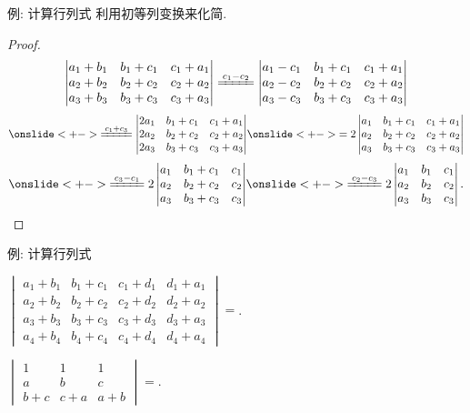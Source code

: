 \begin{frame}{例: 计算行列式}
	\onslide<+->
	利用初等列变换来化简.
	\onslide<+->
	\begin{proof}
		\[\begin{vmatrix}
			a_1+b_1&b_1+c_1&c_1+a_1\\
			a_2+b_2&b_2+c_2&c_2+a_2\\
			a_3+b_3&b_3+c_3&c_3+a_3
		\end{vmatrix}\xeq{c_1-c_2}\begin{vmatrix}
			a_1-c_1&b_1+c_1&c_1+a_1\\
			a_2-c_2&b_2+c_2&c_2+a_2\\
			a_3-c_3&b_3+c_3&c_3+a_3
		\end{vmatrix}\]\[
		\onslide<+->{\xeq{c_1+c_3}\begin{vmatrix}
			2a_1&b_1+c_1&c_1+a_1\\
			2a_2&b_2+c_2&c_2+a_2\\
			2a_3&b_3+c_3&c_3+a_3
		\end{vmatrix}}
		\onslide<+->{=2\begin{vmatrix}
			a_1&b_1+c_1&c_1+a_1\\
			a_2&b_2+c_2&c_2+a_2\\
			a_3&b_3+c_3&c_3+a_3
		\end{vmatrix}}\]\[
		\onslide<+->{\xeq{c_3-c_1}2\begin{vmatrix}
			a_1&b_1+c_1&c_1\\
			a_2&b_2+c_2&c_2\\
			a_3&b_3+c_3&c_3
		\end{vmatrix}}
		\onslide<+->{\xeq{c_2-c_3}2\begin{vmatrix}
			a_1&b_1&c_1\\
			a_2&b_2&c_2\\
			a_3&b_3&c_3
		\end{vmatrix}.\qedhere}\]
	\end{proof}
\end{frame}


\begin{frame}{例: 计算行列式}
	\onslide<+->
	\begin{exercise}
		$\begin{vmatrix}
			a_1+b_1&b_1+c_1&c_1+d_1&d_1+a_1\\
			a_2+b_2&b_2+c_2&c_2+d_2&d_2+a_2\\
			a_3+b_3&b_3+c_3&c_3+d_3&d_3+a_3\\
			a_4+b_4&b_4+c_4&c_4+d_4&d_4+a_4
		\end{vmatrix}=$.
	\end{exercise}
	\onslide<+->
	\begin{exercise}
		$\begin{vmatrix}
			1&1&1\\
			a&b&c\\
			b+c&c+a&a+b
		\end{vmatrix}=$\fillblank{\visible<+->{$0$}}.
	\end{exercise}
\end{frame}


